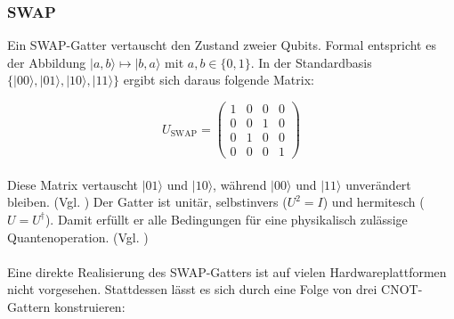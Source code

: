 \subsubsection{SWAP}
Ein SWAP-Gatter vertauscht den Zustand zweier Qubits. Formal entspricht es der Abbildung $|a,b\rangle \mapsto |b,a\rangle$ mit $a,b \in \{0,1\}$. In der Standardbasis $\{|00\rangle, |01\rangle, |10\rangle, |11\rangle\}$ ergibt sich daraus folgende Matrix:

\begin{equation}
U_{\text{SWAP}} =
\begin{pmatrix}
1 & 0 & 0 & 0 \\
0 & 0 & 1 & 0 \\
0 & 1 & 0 & 0 \\
0 & 0 & 0 & 1
\end{pmatrix}
\end{equation}
\\
Diese Matrix vertauscht $|01\rangle$ und $|10\rangle$, während $|00\rangle$ und $|11\rangle$ unverändert bleiben. (Vgl. \cite[S.79]{rieffel_quantum_2011}) Der Gatter ist unitär, selbstinvers ($U^2 = I$) und hermitesch ($U = U^\dagger$). Damit erfüllt er alle Bedingungen für eine physikalisch zulässige Quantenoperation. (Vgl. \cite[S.2]{gheorghiuStandardFormQudit2011})\\
\\
Eine direkte Realisierung des SWAP-Gatters ist auf vielen Hardwareplattformen nicht vorgesehen. Stattdessen lässt es sich durch eine Folge von drei CNOT-Gattern konstruieren:
